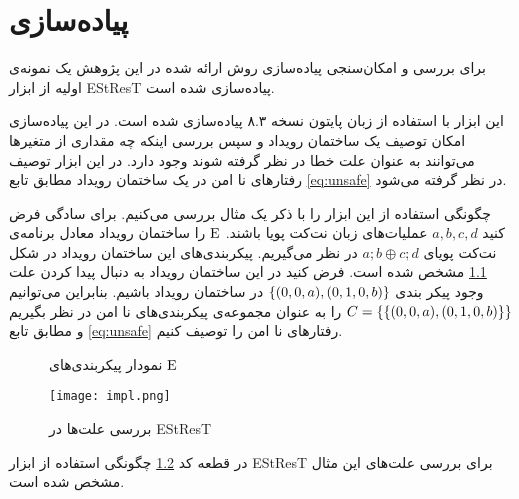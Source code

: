 \chapter{پیاده‌سازی}
برای بررسی و امکان‌سنجی پیاده‌سازی روش ارائه شده در این پژوهش
یک نمونه‌ی اولیه%
از ابزار
EStResT 
پیاده‌سازی شده است.

این ابزار با استفاده از زبان پایتون نسخه ۸.۳ پیاده‌سازی شده است.
در این پیاده‌سازی امکان توصیف یک ساختمان‌ رویداد و سپس بررسی اینکه
چه مقداری از متغیر‌ها می‌توانند به عنوان علت خطا در نظر گرفته شوند وجود دارد.
در این ابزار توصیف رفتار‌های نا امن در یک ساختمان رویداد مطابق تابع
\ref{eq:unsafe}
در نظر گرفته می‌شود.

چگونگی استفاده از این ابزار را با ذکر یک مثال بررسی می‌کنیم.
برای سادگی فرض کنید 
$a,b,c,d$
عملیات‌های زبان نت‌کت پویا باشند.
$\mathrm{E}$
را ساختمان رویداد معادل برنامه‌ی نت‌کت پویای 
$a;b \oplus c;d$
در نظر می‌گیریم.
پیکربندی‌های این ساختمان رویداد در شکل 
\ref{ex:impl:es}
مشخص شده است.
فرض کنید در این ساختمان رویداد به دنبال پیدا کردن علت
وجود پیکر بندی
$\{(0,0,a),(0,1,0,b)\}$
در ساختمان رویداد باشیم.
بنابراین می‌توانیم
$C = \left\{  \{(0,0,a),(0,1,0,b)\}\right\}$
را به عنوان مجموعه‌ی پیکر‌بندی‌های نا امن در نظر 
بگیریم و مطابق تابع
\ref{eq:unsafe}
رفتار‌های نا امن را توصیف کنیم.
\begin{figure}
    \centering
    \caption{نمودار پیکربندی‌های 
    $\mathrm{E}$
    }
    \label{ex:impl:es}
\end{figure}
\begin{figure}
    \centering
    \texttt{[image: impl.png]}
    \caption{بررسی علت‌ها در 
        EStResT 
    }
    \label{ex:impl:code}
\end{figure}
در قطعه کد 
\ref{ex:impl:code}
چگونگی استفاده از ابزار 
EStResT
برای بررسی علت‌های این مثال مشخص شده است.

